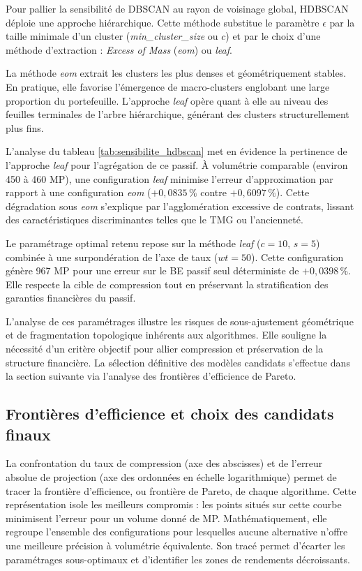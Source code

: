 Pour pallier la sensibilité de DBSCAN au rayon de voisinage global, HDBSCAN déploie une approche hiérarchique. Cette méthode substitue le paramètre $\epsilon$ par la taille minimale d'un cluster (\textit{min\_cluster\_size} ou $c$) et par le choix d'une méthode d'extraction : \textit{Excess of Mass} (\textit{eom}) ou \textit{leaf}. 

La méthode \textit{eom} extrait les clusters les plus denses et géométriquement stables. En pratique, elle favorise l'émergence de macro-clusters englobant une large proportion du portefeuille. L'approche \textit{leaf} opère quant à elle au niveau des feuilles terminales de l'arbre hiérarchique, générant des clusters structurellement plus fins.

L'analyse du tableau \ref{tab:sensibilite_hdbscan} met en évidence la pertinence de l'approche \textit{leaf} pour l'agrégation de ce passif. À volumétrie comparable (environ 450 à 460 MP), une configuration \textit{leaf} minimise l'erreur d'approximation par rapport à une configuration \textit{eom} ($+0{,}0835\,\%$ contre $+0{,}6097\,\%$). Cette dégradation sous \textit{eom} s'explique par l'agglomération excessive de contrats, lissant des caractéristiques discriminantes telles que le TMG ou l'ancienneté.

Le paramétrage optimal retenu repose sur la méthode \textit{leaf} ($c=10$, $s=5$) combinée à une surpondération de l'axe de taux ($wt=50$). Cette configuration génère 967 MP pour une erreur sur le BE passif seul déterministe de $+0{,}0398\,\%$. Elle respecte la cible de compression tout en préservant la stratification des garanties financières du passif.


L'analyse de ces paramétrages illustre les risques de sous-ajustement géométrique et de fragmentation topologique inhérents aux algorithmes. Elle souligne la nécessité d'un critère objectif pour allier compression et préservation de la structure financière. La sélection définitive des modèles candidats s'effectue dans la section suivante via l'analyse des frontières d'efficience de Pareto.

\subsection{Frontières d'efficience et choix des candidats finaux}

La confrontation du taux de compression (axe des abscisses) et de l'erreur absolue de projection (axe des ordonnées en échelle logarithmique) permet de tracer la frontière d'efficience, ou frontière de Pareto, de chaque algorithme. Cette représentation isole les meilleurs compromis : les points situés sur cette courbe minimisent l'erreur pour un volume donné de MP. Mathématiquement, elle regroupe l'ensemble des configurations pour lesquelles aucune alternative n'offre une meilleure précision à volumétrie équivalente. Son tracé permet d'écarter les paramétrages sous-optimaux et d'identifier les zones de rendements décroissants. 

